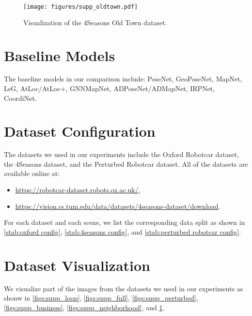 \documentclass[letterpaper]{article} \usepackage{aaai23}  \usepackage{times}  \usepackage{helvet}  \usepackage{courier}  \usepackage[hyphens]{url}  \usepackage{graphicx} \urlstyle{rm} \def\UrlFont{\rm}  \usepackage{natbib}  \usepackage{caption} \frenchspacing  \setlength{\pdfpagewidth}{8.5in} \setlength{\pdfpageheight}{11in} \usepackage{booktabs}
\theoremstyle{remark}
\theoremstyle{plain}
\begin{document}
\begin{figure}[!htb]
\begin{center}
\texttt{[image: figures/supp\_oldtown.pdf]}
\end{center}
\caption{Visualization of the 4Seasons Old Town dataset.}
\label{figs:supp_oldtown}
\end{figure}




\section{Baseline Models}
The baseline models in our comparison include: PoseNet, GeoPoseNet, MapNet, LsG, AtLoc/AtLoc+, GNNMapNet, ADPoseNet/ADMapNet, IRPNet, CoordiNet.




\section{Dataset Configuration}
The datasets we used in our experiments include the Oxford Robotcar dataset, the 4Seasons dataset, and the Perturbed Robotcar dataset. All of the datasets are available online at:
\begin{itemize}
\item \url{https://robotcar-dataset.robots.ox.ac.uk/},
\item \url{https://vision.cs.tum.edu/data/datasets/4seasons-dataset/download}.
\end{itemize}
For each dataset and each scene, we list the corresponding data split as shown in  \cref{stab:oxford config}, \cref{stab:4seasons config}, and \cref{stab:perturbed robotcar config}.


\section{Dataset Visualization}
We visualize part of the images from the datasets we used in our experiments as shonw in \cref{figs:supp_loop}, \cref{figs:supp_full}, \cref{figs:supp_perturbed}, \cref{figs:supp_business}, \cref{figs:supp_neighborhood}, and \cref{figs:supp_oldtown}.
\end{document}
